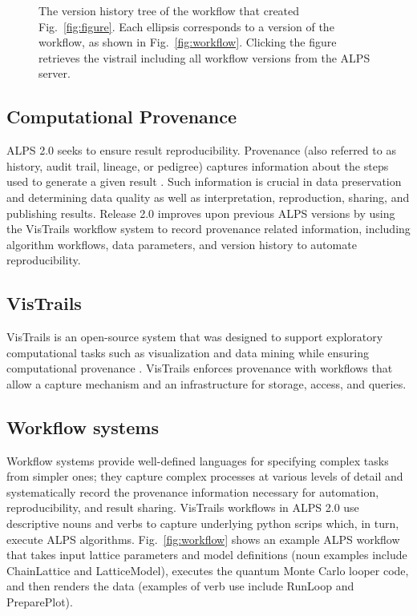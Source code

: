 \documentclass[12pt]{iopart}
\begin{document}
\begin{figure}
\begin{center}
\caption{The version history tree of the workflow that created Fig.~\ref{fig:figure}. Each ellipsis corresponds to a version of the workflow, as shown in Fig.~\ref{fig:workflow}. Clicking the figure retrieves the vistrail including all workflow versions from the ALPS server.}
\label{fig:history}
\end{center}
\end{figure}

\subsection{Computational Provenance}

ALPS 2.0 seeks to ensure result reproducibility.  Provenance (also referred to as history, audit trail, lineage, or pedigree) captures information about the steps used to generate a given result \cite{Silva07,Freire08}.  Such information is crucial in data preservation and determining data quality as well as interpretation, reproduction, sharing, and publishing results.  Release 2.0 improves upon previous ALPS versions by using the VisTrails \cite{vistrails} workflow system to record provenance related information, including algorithm workflows, data parameters, and version history to automate reproducibility. 

\subsection{VisTrails} 
VisTrails is an open-source system that was designed to support exploratory computational tasks such as visualization and data mining while ensuring computational provenance \cite{vistrails,Bavoil05}.  VisTrails enforces provenance with workflows that allow a capture mechanism and an infrastructure for storage, access, and queries.

\subsection{Workflow systems}
Workflow systems provide well-defined languages for specifying complex tasks from simpler ones; they capture complex processes at various levels of detail and systematically record the provenance information necessary for automation, reproducibility, and result sharing.  VisTrails workflows in ALPS 2.0 use descriptive nouns and verbs to capture underlying python scrips which, in turn, execute ALPS algorithms.  Fig.~\ref{fig:workflow} shows an example ALPS workflow that takes input lattice parameters and model definitions (noun examples include ChainLattice and LatticeModel), executes the quantum Monte Carlo looper code, and then renders the data (examples of verb use include RunLoop and PreparePlot).
\end{document}
